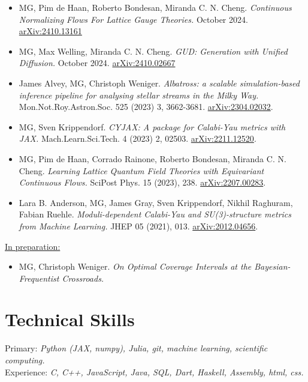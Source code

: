 \documentclass[11pt, letterpaper]{article}
\begin{document}
\begin{itemize}[left=0pt, itemsep=5pt]
    \item {MG}, Pim de Haan, Roberto Bondesan, Miranda C. N. Cheng. \textit{Continuous Normalizing Flows For Lattice Gauge Theories.} October 2024.  \href{https://arxiv.org/abs/2410.13161}{arXiv:2410.13161}

    \item {MG}, Max Welling, Miranda C. N. Cheng. \textit{GUD: Generation with Unified Diffusion.} October 2024. \href{https://arxiv.org/abs/2410.02667}{arXiv:2410.02667}

    \item James Alvey, {MG}, Christoph Weniger. \textit{Albatross: a scalable simulation-based inference pipeline for analysing stellar streams in the Milky Way.} Mon.Not.Roy.Astron.Soc. 525 (2023) 3, 3662-3681. \href{https://arxiv.org/abs/2304.02032}{arXiv:2304.02032}.

    \item {MG}, Sven Krippendorf. \textit{CYJAX: A package for Calabi-Yau metrics with JAX.} Mach.Learn.Sci.Tech. 4 (2023) 2, 02503. \href{https://arxiv.org/abs/2211.12520}{arXiv:2211.12520}.

    \item {MG}, Pim de Haan, Corrado Rainone, Roberto Bondesan, Miranda C. N. Cheng. \textit{Learning Lattice Quantum Field Theories with Equivariant Continuous Flows.} SciPost Phys. 15 (2023), 238. \href{https://arxiv.org/abs/2207.00283}{arXiv:2207.00283}.

    \item Lara B. Anderson, {MG}, James Gray, Sven Krippendorf, Nikhil Raghuram, Fabian Ruehle. \textit{Moduli-dependent Calabi-Yau and SU(3)-structure metrics from Machine Learning.} JHEP 05 (2021), 013. \href{https://arxiv.org/abs/2012.04656}{arXiv:2012.04656}.
\end{itemize}

\underline{In preparation:}

\begin{itemize}[left=0pt, itemsep=5pt]
    \item {MG}, Christoph Weniger. \textit{On Optimal Coverage Intervals at the Bayesian-Frequentist Crossroads.}
\end{itemize}


\section*{Technical Skills}
Primary: \textit{Python (JAX, numpy), Julia, git, machine learning, scientific computing.} \\
Experience: \textit{C, C++, JavaScript, Java, SQL, Dart, Haskell, Assembly, html, css.}
\end{document}
